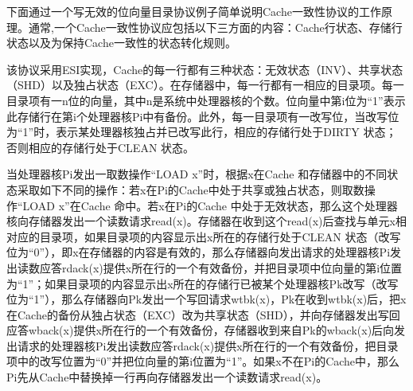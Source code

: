 \documentclass[]{ctexbook}
\begin{document}
下面通过一个写无效的位向量目录协议例子简单说明Cache一致性协议的工作原理。通常,一个Cache一致性协议应包括以下三方面的内容：Cache行状态、存储行状态以及为保持Cache一致性的状态转化规则。

该协议采用ESI实现，Cache的每一行都有三种状态：无效状态（INV）、共享状态（SHD）以及独占状态（EXC）。在存储器中，每一行都有一相应的目录项。每一目录项有一n位的向量，其中n是系统中处理器核的个数。位向量中第i位为``1''表示此存储行在第i个处理器核Pi中有备份。此外，每一目录项有一改写位，当改写位为``1''时，表示某处理器核独占并已改写此行，相应的存储行处于DIRTY 状态；否则相应的存储行处于CLEAN 状态。

当处理器核Pi发出一取数操作``LOAD x''时，根据x在Cache 和存储器中的不同状态采取如下不同的操作：若x在Pi的Cache中处于共享或独占状态，则取数操作``LOAD x''在Cache 命中。若x在Pi的Cache 中处于无效状态，那么这个处理器核向存储器发出一个读数请求read(x)。存储器在收到这个read(x)后查找与单元x相对应的目录项，如果目录项的内容显示出x所在的存储行处于CLEAN 状态（改写位为``0''），即x在存储器的内容是有效的，那么存储器向发出请求的处理器核Pi发出读数应答rdack(x)提供x所在行的一个有效备份，并把目录项中位向量的第i位置为``1''；如果目录项的内容显示出x所在的存储行已被某个处理器核Pk改写（改写位为``1''），那么存储器向Pk发出一个写回请求wtbk(x)，Pk在收到wtbk(x)后，把x在Cache的备份从独占状态（EXC）改为共享状态（SHD），并向存储器发出写回应答wback(x)提供x所在行的一个有效备份，存储器收到来自Pk的wback(x)后向发出请求的处理器核Pi发出读数应答rdack(x)提供x所在行的一个有效备份，把目录项中的改写位置为``0''并把位向量的第i位置为``1''。如果x不在Pi的Cache中，那么Pi先从Cache中替换掉一行再向存储器发出一个读数请求read(x)。
\end{document}
